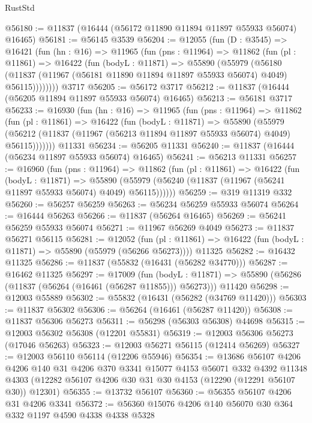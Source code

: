 \begin{lexlean}{RustStd}
\begin{coremodule}
{\begin{coremodule}
{{{{{{{{{{{{{{{{{{{{{{{{{{{{{{{{{{{{{{{{{{{{{{{{{{@56180 := @11837 (@16444 (@56172 @11890 @11894 @11897 @55933 @56074) @16465)
@56181 := @56145 @3539
@56204 := @12055
    (fun (D : @3545) =>
    @16421
      (fun (hn : @16) =>
      @11965
        (fun (pns : @11964) =>
        @11862
          (fun (pl : @11861) =>
          @16422
            (fun (bodyL : @11871) =>
            @55890
              (@55979
                (@56180
                  (@11837 (@11967 (@56181 @11890 @11894 @11897 @55933 @56074) @4049) @56115))))))))
    @3717
@56205 := @56172 @3717
@56212 := @11837 (@16444 (@56205 @11894 @11897 @55933 @56074) @16465)
@56213 := @56181 @3717
@56233 := @16930
    (fun (hn : @16) =>
    @11965
      (fun (pns : @11964) =>
      @11862
        (fun (pl : @11861) =>
        @16422
          (fun (bodyL : @11871) =>
          @55890
            (@55979
              (@56212 (@11837 (@11967 (@56213 @11894 @11897 @55933 @56074) @4049) @56115)))))))
    @11331
@56234 := @56205 @11331
@56240 := @11837 (@16444 (@56234 @11897 @55933 @56074) @16465)
@56241 := @56213 @11331
@56257 := @16960
    (fun (pns : @11964) =>
    @11862
      (fun (pl : @11861) =>
      @16422
        (fun (bodyL : @11871) =>
        @55890 (@55979 (@56240 (@11837 (@11967 (@56241 @11897 @55933 @56074) @4049) @56115))))))
@56259 := @319 @11319 @332
@56260 := @56257 @56259
@56263 := @56234 @56259 @55933 @56074
@56264 := @16444 @56263
@56266 := @11837 (@56264 @16465)
@56269 := @56241 @56259 @55933 @56074
@56271 := @11967 @56269 @4049
@56273 := @11837 @56271 @56115
@56281 := @12052
    (fun (pl : @11861) => @16422 (fun (bodyL : @11871) => @55890 (@55979 (@56266 @56273))))
    @11325
@56282 := @16432 @11325
@56286 := @11837 (@55832 (@16431 (@56282 @34770)))
@56287 := @16462 @11325
@56297 := @17009
    (fun (bodyL : @11871) => @55890 (@56286 (@11837 (@56264 (@16461 (@56287 @11855))) @56273)))
    @11420
@56298 := @12003 @55889
@56302 := @55832 (@16431 (@56282 (@34769 @11420)))
@56303 := @11837 @56302
@56306 := @56264 (@16461 (@56287 @11420))
@56308 := @11837 @56306 @56273
@56311 := @56298 (@56303 @56308) @44698
@56315 := @12003 @56302 @56308 (@12201 @55831)
@56319 := @12003 @56306 @56273 (@17046 @56263)
@56323 := @12003 @56271 @56115 (@12414 @56269)
@56327 := @12003 @56110 @56114 (@12206 @55946)
@56354 := @13686
    @56107
    @4206
    @4206
    @140
    @31
    @4206
    @370
    @3341
    @15077
    @4153
    @56071
    @332
    @4392
    @11348
    @4303
    (@12282 @56107 @4206 @30 @31 @30 @4153 (@12290 (@12291 @56107 @30)) @12301)
@56355 := @13732 @56107
@56360 := @56355 @56107 @4206 @31 @4206 @3341
@56372 := @56360 @15076 @4206 @140 @56070 @30 @364 @332 @1197 @4590 @4338 @4338 @5328
}}}}}}}}}}}}}}}}}}}}}}}}}}}}}}}}}}}}}}}}}}}}}}}}}}
\end{coremodule}}
\end{coremodule}
\end{lexlean}
